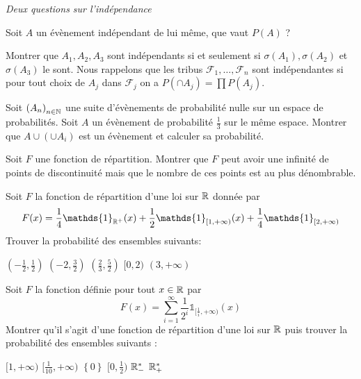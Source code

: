 \documentclass{report}
\begin{document}
\begin{exo}
    \textit{Deux questions sur l'indépendance}
    \begin{q}{1}
        Soit \(A\) un évènement indépendant de lui même, que vaut \(P(A)\) ?
    \end{q}
    \begin{q}{2}
        Montrer que \(A_1,A_2,A_3\) sont indépendants si et seulement si
        \(\sigma(A_1), \sigma(A_2)\) et \(\sigma(A_3)\) le sont. Nous rappelons
        que les tribus \(\mathcal{F}_1,\dots,\mathcal{F}_n\) sont indépendantes si
        pour tout choix de \(A_j\) dans \(\mathcal{F}_j\) on a \(P(\cap A_j)=
        \prod P(A_j)\).
    \end{q}
\end{exo}

\begin{exo}
    Soit \(\left(A_n\right)_{n\in\mathbb{N}}\) une suite d'évènements de probabilité
    nulle sur un espace de probabilités. Soit \(A\) un évènement de probabilité
    \(\frac13\) sur le même espace. Montrer que \(A\cup (\cup A_i)\) est un évènement
    et calculer sa probabilité.
\end{exo}

\begin{exo}
    Soit \(F\) une fonction de répartition. Montrer que \(F\) peut avoir une infinité
    de points de discontinuité mais que le nombre de ces points est au plus dénombrable.
\end{exo}

\begin{exo}
    Soit \(F\) la fonction de répartition d'une loi sur \(\mathbb{R}\) donnée par
    \[F(x)=\frac14\mathds{1}_{\R^+}(x)+
            \frac12\mathds{1}_{[1,+\infty)}(x)+
            \frac14\mathds{1}_{[2,+\infty)}\]
    Trouver la probabilité des ensembles suivants:
    \begin{enumerate}
        \itt \( (-\frac12,\frac12)\)
        \itt \( (-2,\frac32)\)
        \itt \((\frac23,\frac52)\)
        \itt \([0,2)\)
        \itt \((3,+\infty)\)
    \end{enumerate}
\end{exo}

\begin{exo}
    Soit \(F\) la fonction définie pour tout \(x\in\mathbb{R}\) par
    \[F(x)=\sum_{i=1}^\infty \frac{1}{2^i}\mathds{1}_{[\frac{1}{i},+\infty)}(x)\]
    Montrer qu'il s'agit d'une fonction de répartition d'une loi sur \(\mathbb{R}\) puis
    trouver la probabilité des ensembles suivants :
    \begin{enumerate}
        \itt \([1,+\infty)\)
        \itt \([\frac{1}{10},+\infty)\)
        \itt \(\left\{ 0 \right\}\)
        \itt \([0,\frac12)\)
        \itt \(\mathbb{R}_-^*\)
        \itt \(\mathbb{R}_+^*\)
    \end{enumerate}
\end{exo}
\end{document}
